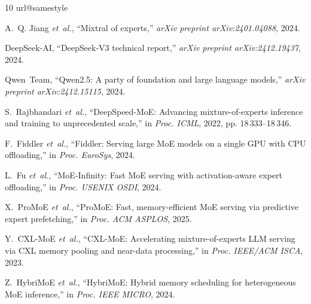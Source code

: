 \documentclass[10pt,journal,compsoc]{IEEEtran}
\begin{document}
\begin{thebibliography}{10}
\providecommand{\url}[1]{#1}
\csname url@samestyle\endcsname
\providecommand{\newblock}{\relax}
\providecommand{\bibinfo}[2]{#2}
\providecommand{\BIBentrySTDinterwordspacing}{\spaceskip=0pt\relax}
\providecommand{\BIBentryALTinterwordstretchfactor}{4}
\providecommand{\BIBentryALTinterwordspacing}{\spaceskip=\fontdimen2\font plus
\BIBentryALTinterwordstretchfactor\fontdimen3\font minus
  \fontdimen4\font\relax}
\providecommand{\BIBforeignlanguage}[2]{{%
\expandafter\ifx\csname l@#1\endcsname\relax
\typeout{** WARNING: IEEEtran.bst: No hyphenation pattern has been}%
\typeout{** loaded for the language `#1'. Using the pattern for}%
\typeout{** the default language instead.}%
\else
\language=\csname l@#1\endcsname
\fi
#2}}
\providecommand{\BIBdecl}{\relax}
\BIBdecl

A.~Q. Jiang \emph{et~al.}, ``Mixtral of experts,'' \emph{arXiv preprint arXiv:2401.04088}, 2024.

DeepSeek-AI, ``DeepSeek-V3 technical report,'' \emph{arXiv preprint arXiv:2412.19437}, 2024.

Qwen~Team, ``Qwen2.5: A party of foundation and large language models,'' \emph{arXiv preprint arXiv:2412.15115}, 2024.

S.~Rajbhandari \emph{et~al.}, ``DeepSpeed-MoE: Advancing mixture-of-experts inference and training to unprecedented scale,'' in \emph{Proc. ICML}, 2022, pp. 18\,333--18\,346.

F.~Fiddler \emph{et~al.}, ``Fiddler: Serving large MoE models on a single GPU with CPU offloading,'' in \emph{Proc. EuroSys}, 2024.

L.~Fu \emph{et~al.}, ``MoE-Infinity: Fast MoE serving with activation-aware expert offloading,'' in \emph{Proc. USENIX OSDI}, 2024.

X.~ProMoE \emph{et~al.}, ``ProMoE: Fast, memory-efficient MoE serving via predictive expert prefetching,'' in \emph{Proc. ACM ASPLOS}, 2025.

Y.~CXL-MoE \emph{et~al.}, ``CXL-MoE: Accelerating mixture-of-experts LLM serving via CXL memory pooling and near-data processing,'' in \emph{Proc. IEEE/ACM ISCA}, 2023.

Z.~HybriMoE \emph{et~al.}, ``HybriMoE: Hybrid memory scheduling for heterogeneous MoE inference,'' in \emph{Proc. IEEE MICRO}, 2024.


\end{thebibliography}
\end{document}
